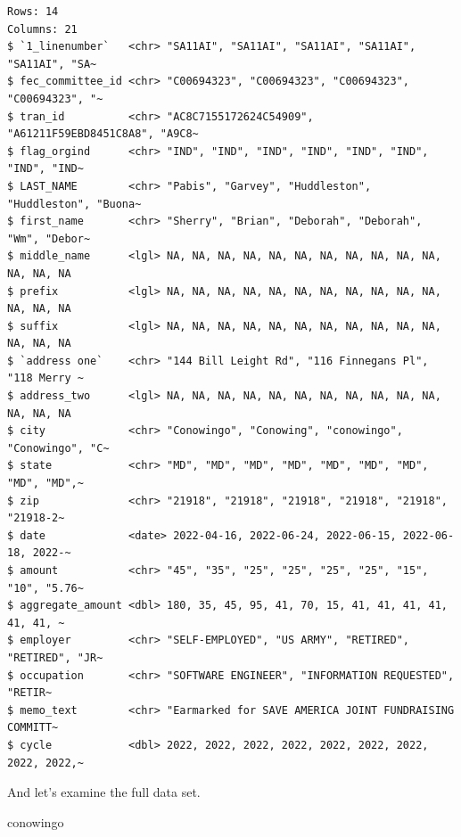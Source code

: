 \documentclass[
  letterpaper,
  DIV=11,
  numbers=noendperiod]{scrreprt}
\newenvironment{Shaded}{\begin{snugshade}}{\end{snugshade}}
\newcommand{\NormalTok}[1]{\textcolor[rgb]{0.00,0.23,0.31}{#1}}
\begin{document}
\begin{verbatim}
Rows: 14
Columns: 21
$ `1_linenumber`   <chr> "SA11AI", "SA11AI", "SA11AI", "SA11AI", "SA11AI", "SA~
$ fec_committee_id <chr> "C00694323", "C00694323", "C00694323", "C00694323", "~
$ tran_id          <chr> "AC8C7155172624C54909", "A61211F59EBD8451C8A8", "A9C8~
$ flag_orgind      <chr> "IND", "IND", "IND", "IND", "IND", "IND", "IND", "IND~
$ LAST_NAME        <chr> "Pabis", "Garvey", "Huddleston", "Huddleston", "Buona~
$ first_name       <chr> "Sherry", "Brian", "Deborah", "Deborah", "Wm", "Debor~
$ middle_name      <lgl> NA, NA, NA, NA, NA, NA, NA, NA, NA, NA, NA, NA, NA, NA
$ prefix           <lgl> NA, NA, NA, NA, NA, NA, NA, NA, NA, NA, NA, NA, NA, NA
$ suffix           <lgl> NA, NA, NA, NA, NA, NA, NA, NA, NA, NA, NA, NA, NA, NA
$ `address one`    <chr> "144 Bill Leight Rd", "116 Finnegans Pl", "118 Merry ~
$ address_two      <lgl> NA, NA, NA, NA, NA, NA, NA, NA, NA, NA, NA, NA, NA, NA
$ city             <chr> "Conowingo", "Conowing", "conowingo", "Conowingo", "C~
$ state            <chr> "MD", "MD", "MD", "MD", "MD", "MD", "MD", "MD", "MD",~
$ zip              <chr> "21918", "21918", "21918", "21918", "21918", "21918-2~
$ date             <date> 2022-04-16, 2022-06-24, 2022-06-15, 2022-06-18, 2022-~
$ amount           <chr> "45", "35", "25", "25", "25", "25", "15", "10", "5.76~
$ aggregate_amount <dbl> 180, 35, 45, 95, 41, 70, 15, 41, 41, 41, 41, 41, 41, ~
$ employer         <chr> "SELF-EMPLOYED", "US ARMY", "RETIRED", "RETIRED", "JR~
$ occupation       <chr> "SOFTWARE ENGINEER", "INFORMATION REQUESTED", "RETIR~
$ memo_text        <chr> "Earmarked for SAVE AMERICA JOINT FUNDRAISING COMMITT~
$ cycle            <dbl> 2022, 2022, 2022, 2022, 2022, 2022, 2022, 2022, 2022,~
\end{verbatim}

And let's examine the full data set.

\begin{Shaded}
\begin{Highlighting}[]
\NormalTok{conowingo}
\end{Highlighting}
\end{Shaded}
\end{document}
